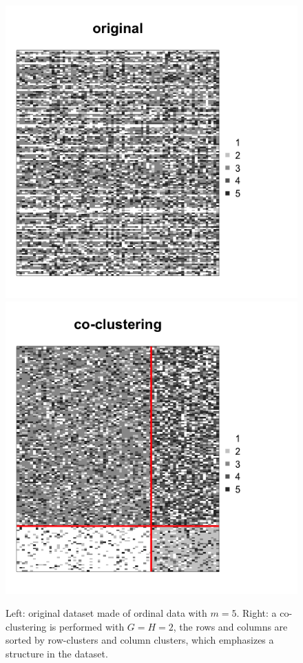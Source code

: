 \begin{figure}[ht!]
\centering
  \includegraphics[width = .48\textwidth]{images/ex-original.png}
  \includegraphics[width = .48\textwidth]{images/ex-coclust.png}
    \caption{Left: original dataset made of ordinal data with $m=5$. Right: a co-clustering is performed with $G=H=2$, the rows and columns are sorted by row-clusters and column clusters, which emphasizes a structure in the dataset.}
    \label{fig:ex-coclustering}
\end{figure}

